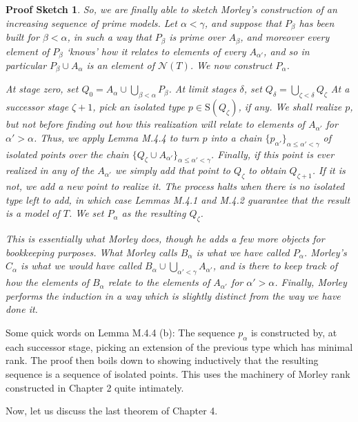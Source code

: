 \documentclass{article}
\theoremstyle{nonumberplain}
\newtheorem{sketch}{Proof Sketch}
\newcommand{\calN}{\mathcal{N}}
\newcommand{\Stone}{\mathrm{S}}
\begin{document}
\begin{sketch}
So, we are finally able to sketch Morley's construction of an increasing sequence of prime models. Let $\alpha < \gamma$, and suppose that $P_\beta$ has been built for $\beta < \alpha$, in such a way that $P_\beta$ is prime over $A_\beta$, and moreover every element of $P_\beta$ `knows' how it relates to elements of every $A_{\alpha'}$, and so in particular $P_\beta \cup A_\alpha$ is an element of $\calN(T)$. We now construct $P_\alpha$.

At stage zero, set $Q_0 = A_\alpha \cup \bigcup_{\beta<\alpha} P_\beta$. At limit stages $\delta$, set $Q_\delta = \bigcup_{\zeta < \delta} Q_\zeta$ At a successor stage $\zeta+1$, pick an isolated type $p \in \Stone(Q_\zeta)$, if any. We shall realize $p$, but not before finding out how this realization will relate to elements of $A_{\alpha'}$ for $\alpha' > \alpha$. Thus, we apply Lemma M.4.4 to turn $p$ into a chain $\{p_{\alpha'}\}_{\alpha \leq \alpha' < \gamma}$ of isolated points over the chain $\{Q_\zeta \cup A_{\alpha'}\}_{\alpha \leq \alpha' < \gamma}$. Finally, if this point is ever realized in any of the $A_{\alpha'}$ we simply add that point to $Q_\zeta$ to obtain $Q_{\zeta+1}$. If it is not, we add a new point to realize it. The process halts when there is no isolated type left to add, in which case Lemmas M.4.1 and M.4.2 guarantee that the result is a model of $T$. We set $P_\alpha$ as the resulting $Q_\zeta$.

This is essentially what Morley does, though he adds a few more objects for bookkeeping purposes. What Morley calls $B_\alpha$ is what we have called $P_\alpha$. Morley's $C_\alpha$ is what we would have called $B_\alpha \cup \bigcup_{\alpha' < \gamma} A_{\alpha'}$, and is there to keep track of how the elements of $B_\alpha$ relate to the elements of $A_{\alpha'}$ for $\alpha' > \alpha$. Finally, Morley performs the induction in a way which is slightly distinct from the way we have done it.
\end{sketch}

Some quick words on Lemma M.4.4 (b): The sequence $p_\alpha$ is constructed by, at each successor stage, picking an extension of the previous type which has minimal rank. The proof then boils down to showing inductively that the resulting sequence is a sequence of isolated points. This uses the machinery of Morley rank constructed in Chapter 2 quite intimately.

\smallskip

Now, let us discuss the last theorem of Chapter 4.
\end{document}
